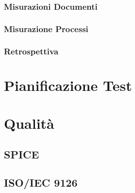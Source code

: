 \documentclass[a4paper, oneside, openany, dvipsnames, table]{article}
\begin{document}
		\subsubsection{Misurazioni Documenti}
			
		\subsubsection{Misurazione Processi}
			
		\subsubsection{Retrospettiva}
			
\newpage
\section{Pianificazione Test}
	\label{app:misure}
	
	
\newpage
\section{Qualità}
	\subsection{SPICE}
		\label{app:SPICE}
		
	\subsection{ISO/IEC 9126}
		\label{app:ISO/IEC 9126}
		
\end{document}
